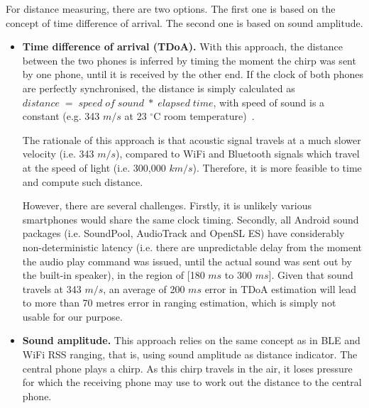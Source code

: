 \documentclass[graybox]{svmult}
\begin{document}
For distance measuring, there are two options. The first one is based on the concept of time difference of arrival. The second one is based on sound amplitude.
\begin{itemize}
    \item \textbf{Time difference of arrival (TDoA).} With this approach, the distance between the two phones is inferred by timing the moment the chirp was sent by one phone, until it is received by the other end. If the clock of both phones are perfectly synchronised, the distance is simply calculated as $distance\;=\;speed\;of\;sound\;*\;elapsed\;time$, with speed of sound is a constant (e.g. 343 $m/s$ at 23 $^{\circ}$C room temperature)~\cite{yavuz2015measuring}.
    
    The rationale of this approach is that acoustic signal travels at a much slower velocity (i.e. 343 $m/s$), compared to WiFi and Bluetooth signals which travel at the speed of light (i.e. 300,000 $km/s$). Therefore, it is more feasible to time and compute such distance.
    
    However, there are several challenges. Firstly, it is unlikely various smartphones would share the same clock timing. Secondly, all Android sound packages (i.e. SoundPool, AudioTrack and OpenSL ES) have considerably non-deterministic latency (i.e. there are unpredictable delay from the moment the audio play command was issued, until the actual sound was sent out by the built-in speaker), in the region of [180 $ms$ to 300 $ms$]. Given that sound travels at 343 $m/s$, an average of 200 $ms$ error in TDoA estimation will lead to more than 70 metres error in ranging estimation, which is simply not usable for our purpose.
    
    \item \textbf{Sound amplitude.} This approach relies on the same concept as in BLE and WiFi RSS ranging, that is, using sound amplitude as distance indicator. The central phone plays a chirp. As this chirp travels in the air, it loses pressure for which the receiving phone may use to work out the distance to the central phone.
\end{itemize}
\end{document}

